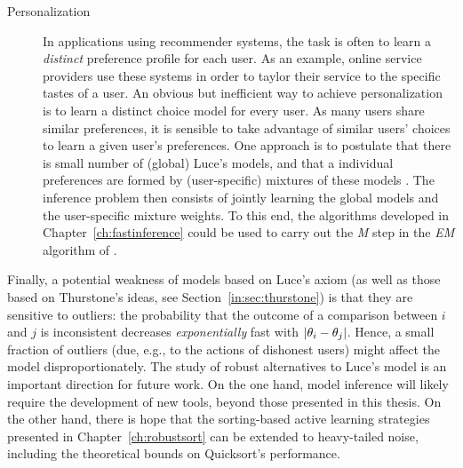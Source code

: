 \begin{description}
\item[Personalization] In applications using recommender systems, the task is often to learn a \emph{distinct} preference profile for each user.
As an example, online service providers use these systems in order to taylor their service to the specific tastes of a user.
An obvious but inefficient way to achieve personalization is to learn a distinct choice model for every user.
As many users share similar preferences, it is sensible to take advantage of similar users' choices to learn a given user's preferences.
One approach is to postulate that there is small number of (global) Luce's models, and that a individual preferences are formed by (user-specific) mixtures of these models \citep{gormley2008exploring, ammar2014what}.
The inference problem then consists of jointly learning the global models and the user-specific mixture weights.
To this end, the algorithms developed in Chapter~\ref{ch:fastinference} could be used to carry out the \emph{M} step in the \emph{EM} algorithm of \citet{gormley2008exploring}.
\end{description}

Finally, a potential weakness of models based on Luce's axiom (as well as those based on Thurstone's ideas, see Section~\ref{in:sec:thurstone}) is that they are sensitive to outliers: the probability that the outcome of a comparison between $i$ and $j$ is inconsistent decreases \emph{exponentially} fast with $\lvert\theta_i - \theta_j\rvert$.
Hence, a small fraction of outliers (due, e.g., to the actions of dishonest users) might affect the model disproportionately.
The study of robust alternatives to Luce's model is an important direction for future work.
On the one hand, model inference will likely require the development of new tools, beyond those presented in this thesis.
On the other hand, there is hope that the sorting-based active learning strategies presented in Chapter~\ref{ch:robustsort} can be extended to heavy-tailed noise, including the theoretical bounds on Quicksort's performance.
